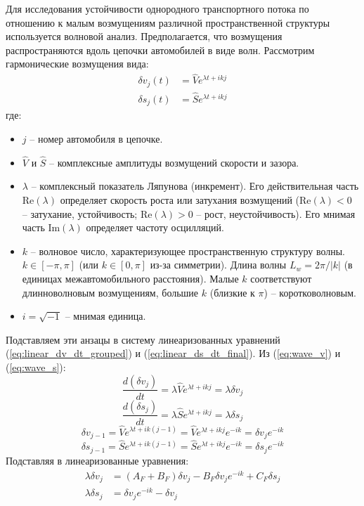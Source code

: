 \documentclass[12pt, a4paper]{article}
\begin{document}
Для исследования устойчивости однородного транспортного потока по отношению к малым возмущениям различной пространственной структуры используется волновой анализ. Предполагается, что возмущения распространяются вдоль цепочки автомобилей в виде волн.
Рассмотрим гармонические возмущения вида:
\begin{align}
\delta v_j(t) &= \hat{V} e^{\lambda t + i k j} \label{eq:wave_v} \\
\delta s_j(t) &= \hat{S} e^{\lambda t + i k j} \label{eq:wave_s}
\end{align}
где:
\begin{itemize}
    \item $j$ – номер автомобиля в цепочке.
    \item $\hat{V}$ и $\hat{S}$ – комплексные амплитуды возмущений скорости и зазора.
    \item $\lambda$ – комплексный показатель Ляпунова (инкремент). Его действительная часть $\text{Re}(\lambda)$ определяет скорость роста или затухания возмущений ($\text{Re}(\lambda) < 0$ – затухание, устойчивость; $\text{Re}(\lambda) > 0$ – рост, неустойчивость). Его мнимая часть $\text{Im}(\lambda)$ определяет частоту осцилляций.
    \item $k$ – волновое число, характеризующее пространственную структуру волны. $k \in [-\pi, \pi]$ (или $k \in [0, \pi]$ из-за симметрии). Длина волны $L_w = 2\pi/|k|$ (в единицах межавтомобильного расстояния). Малые $k$ соответствуют длинноволновым возмущениям, большие $k$ (близкие к $\pi$) – коротковолновым.
    \item $i = \sqrt{-1}$ – мнимая единица.
\end{itemize}
Подставляем эти анзацы в систему линеаризованных уравнений (\ref{eq:linear_dv_dt_grouped}) и (\ref{eq:linear_ds_dt_final}).
Из (\ref{eq:wave_v}) и (\ref{eq:wave_s}):
\[ \frac{d(\delta v_j)}{dt} = \lambda \hat{V} e^{\lambda t + i k j} = \lambda \delta v_j \]
\[ \frac{d(\delta s_j)}{dt} = \lambda \hat{S} e^{\lambda t + i k j} = \lambda \delta s_j \]
\[ \delta v_{j-1} = \hat{V} e^{\lambda t + i k (j-1)} = \hat{V} e^{\lambda t + i k j} e^{-ik} = \delta v_j e^{-ik} \]
\[ \delta s_{j-1} = \hat{S} e^{\lambda t + i k (j-1)} = \hat{S} e^{\lambda t + i k j} e^{-ik} = \delta s_j e^{-ik} \]
Подставляя в линеаризованные уравнения:
\begin{align*}
\lambda \delta v_j &= (A_F + B_F) \delta v_j - B_F \delta v_j e^{-ik} + C_F \delta s_j \\
\lambda \delta s_j &= \delta v_j e^{-ik} - \delta v_j
\end{align*}
\end{document}
